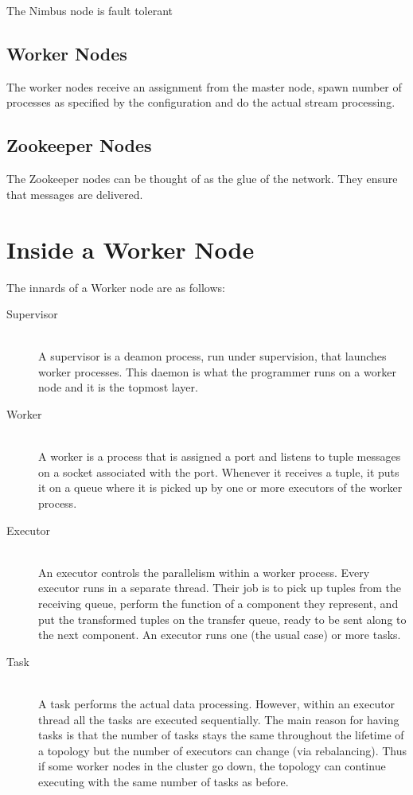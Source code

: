 \documentclass[bsc,frontabs,twoside,singlespacing,normalheadings,parskip,logo]{infthesis}     %
\begin{document}
The Nimbus node is fault tolerant

\subsection{Worker Nodes}

The worker nodes receive an assignment from the master node, spawn number of processes as specified by the configuration and do the actual stream processing.

\subsection{Zookeeper Nodes}

The Zookeeper nodes can be thought of as the glue of the network. They ensure that messages are delivered.

\section{Inside a Worker Node}

The innards of a Worker node are as follows:

\begin{description}
	\item[Supervisor] \hfill \\
	A supervisor is a deamon process, run under supervision, that launches worker processes. This daemon is what the programmer runs on a worker node and it is the topmost layer.
	\item[Worker] \hfill \\
	A worker is a process that is assigned a port and listens to tuple messages on a socket associated with the port. Whenever it receives a tuple, it puts it on a queue where it is picked up by one or more executors of the worker process.
	\item[Executor] \hfill \\
	An executor controls the parallelism within a worker process. Every executor runs in a separate thread. Their job is to pick up tuples from the receiving queue, perform the function of a component they represent, and put the transformed tuples on the transfer queue, ready to be sent along to the next component. An executor runs one (the usual case) or more tasks.
	\item[Task] \hfill \\
	A task performs the actual data processing. However, within an executor thread all the tasks are executed sequentially. The main reason for having tasks is that the number of tasks stays the same throughout the lifetime of a topology but the number of executors can change (via rebalancing). Thus if some worker nodes in the cluster go down, the topology can continue executing with the same number of tasks as before.
\end{description}
\end{document}
